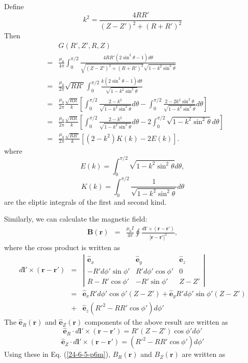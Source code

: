 \documentclass{llncs}
\begin{document}
Define
\begin{equation}
  k^2 = \frac{4 R R'}{(Z - Z')^2 + (R + R')^2}
\end{equation}
Then
\begin{eqnarray}
  &  & G (R', Z', R, Z) \nonumber\\
  & = & \frac{\mu_0}{4 \pi} \int_0^{\pi / 2} \frac{4 R R' (2 \sin^2 \theta -
  1) d \theta}{\sqrt{(Z - Z')^2 + (R + R')^2} \sqrt{1 - k^2 \sin^2 \theta}}
  \nonumber\\
  & = & \frac{\mu_0}{2 \pi} \sqrt{R R'} \int_0^{\pi / 2} \frac{k (2 \sin^2
  \theta - 1) d \theta}{\sqrt{1 - k^2 \sin^2 \theta}} \nonumber\\
  & = & \frac{\mu_0}{2 \pi} \frac{\sqrt{R R}}{k} \left[ \int_0^{\pi / 2}
  \frac{2 - k^2}{\sqrt{1 - k^2 \sin^2 \theta}} d \theta - \int_0^{\pi / 2}
  \frac{2 - 2 k^2 \sin^2 \theta}{\sqrt{1 - k^2 \sin^2 \theta}} d \theta
  \right] \nonumber\\
  & = & \frac{\mu_0}{2 \pi}  \frac{\sqrt{R R}}{k} \left[ \int_0^{\pi / 2}
  \frac{2 - k^2}{\sqrt{1 - k^2 \sin^2 \theta}} d \theta - 2 \int_0^{\pi / 2}
  \sqrt{1 - k^2 \sin^2 \theta} d \theta \right] \nonumber\\
  & = & \frac{\mu_0}{2 \pi} \frac{\sqrt{R R'}}{k} [(2 - k^2) K (k) - 2 E (k)]
  . 
\end{eqnarray}
where
\[ E (k) = \int_0^{\pi / 2} \sqrt{1 - k^2 \sin^2 \theta} d \theta, \]
\[ K (k) = \int_0^{\pi / 2} \frac{1}{\sqrt{1 - k^2 \sin^2 \theta}} d \theta \]
are the eliptic integrals of the first and second kind.

Similarly, we can calculate the magnetic field:
\begin{eqnarray}
  \mathbf{B} (\mathbf{r}) & = & \frac{\mu_0 I}{4 \pi} \oint \frac{d\mathbf{l}'
  \times (\mathbf{r}-\mathbf{r}')}{| \mathbf{r}-\mathbf{r}' |^3}, 
  \label{24-6-5-p6m}
\end{eqnarray}
where the cross product is written as
\begin{eqnarray*}
  d\mathbf{l}' \times (\mathbf{r}-\mathbf{r}') & = & \left|\begin{array}{ccc}
    \hat{\mathbf{e}}_x & \hat{\mathbf{e}}_y & \hat{\mathbf{e}}_z\\
    - R' d \phi' \sin \phi' & R' d \phi' \cos \phi' & 0\\
    R - R' \cos \phi' & - R' \sin \phi' & Z - Z'
  \end{array}\right|\\
  & = & \hat{\mathbf{e}}_x R' d \phi' \cos \phi' (Z - Z') +
  \hat{\mathbf{e}}_y R' d \phi' \sin \phi' (Z - Z')\\
  & + & \hat{\mathbf{e}}_z \left( {R'}^2 - R R' \cos \phi' \right) d \phi'
\end{eqnarray*}
The $\hat{\mathbf{e}}_R (\mathbf{r})$ and $\hat{\mathbf{e}}_Z (\mathbf{r})$
components of the above result are written as
\[ \hat{\mathbf{e}}_R \cdot d\mathbf{l}' \times (\mathbf{r}-\mathbf{r}') = R' 
   (Z - Z') \cos \phi' d \phi' \]
\[ \hat{\mathbf{e}}_Z \cdot d\mathbf{l}' \times (\mathbf{r}-\mathbf{r}') =
   \left( {R'}^2 - R R' \cos \phi' \right) d \phi' \]
Using these in Eq. (\ref{24-6-5-p6m}), $B_R (\mathbf{r})$ and $B_Z
(\mathbf{r})$ are written as
\end{document}
